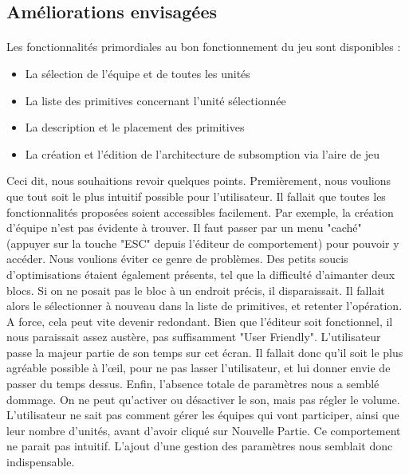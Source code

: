 \documentclass{report}
\begin{document}
\subsection{Améliorations envisagées}
\paragraph{}
Les fonctionnalités primordiales au bon fonctionnement du jeu sont disponibles :
\begin{itemize}
\item La sélection de l’équipe et de toutes les unités 
\item La liste des primitives concernant l’unité sélectionnée 
\item La description et le placement des primitives 
\item La création et l’édition de l’architecture de subsomption via l’aire de jeu
\end{itemize}

Ceci dit, nous souhaitions revoir quelques points. \newline
Premièrement, nous voulions que tout soit le plus intuitif possible pour l'utilisateur. Il fallait que toutes les fonctionnalités proposées soient accessibles facilement. Par exemple, la création d'équipe n'est pas évidente à trouver. Il faut passer par un menu "caché" (appuyer sur la touche "ESC" depuis l'éditeur de comportement) pour pouvoir y accéder. Nous voulions éviter ce genre de problèmes. Des petits soucis d'optimisations étaient également présents, tel que la difficulté d'aimanter deux blocs. Si on ne posait pas le bloc à un endroit précis, il disparaissait. Il fallait alors le sélectionner à nouveau dans la liste de primitives, et retenter l'opération. A force, cela peut vite devenir redondant.
\newline
\smallbreak
Bien que l'éditeur soit fonctionnel, il nous paraissait assez austère, pas suffisamment "User Friendly". L'utilisateur passe la majeur partie de son temps sur cet écran. Il fallait donc qu'il soit le plus agréable  possible à l’œil, pour ne pas lasser l'utilisateur, et lui donner envie de passer du temps dessus.\newline \smallbreak
Enfin, l'absence totale de paramètres nous a semblé dommage. On ne peut qu'activer ou désactiver le son, mais pas régler le volume. L'utilisateur ne sait pas comment gérer les équipes qui vont participer, ainsi que leur nombre d'unités, avant d'avoir cliqué sur Nouvelle Partie. Ce comportement ne parait pas intuitif. L'ajout d'une gestion des paramètres nous semblait donc indispensable.
\end{document}

